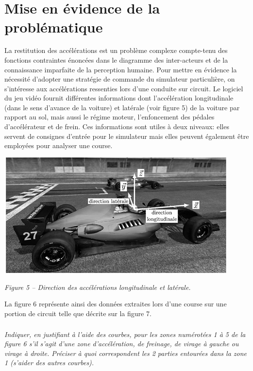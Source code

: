 \documentclass[10pt,fleqn]{article} %
\begin{document}
\section{Mise en évidence de la problématique \label{sec_1}}
La restitution des accélérations est un problème complexe compte-tenu des fonctions contraintes énoncées dans le diagramme des inter-acteurs et de la connaissance imparfaite de la perception humaine. 
Pour mettre en évidence la nécessité d'adopter une stratégie de commande du simulateur particulière, on s'intéresse aux accélérations ressenties lors d'une conduite sur circuit. Le logiciel du jeu vidéo fournit différentes informations dont l'accélération longitudinale (dans le sens d'avance de la voiture) et latérale (voir figure 5) de la voiture par rapport au sol, mais aussi le régime moteur, l'enfoncement des pédales d'accélérateur et de frein. Ces informations sont utiles à deux niveaux: elles servent de consignes d'entrée pour le simulateur mais elles peuvent également être employées pour analyser une course. 


\begin{center}
\includegraphics[width=.9\linewidth]{images/fig_05}

\textit{Figure 5 -- Direction des accélérations longitudinale et latérale.}
\end{center}

La figure 6%
représente ainsi des données extraites lors d'une course sur une portion de circuit telle que décrite sur la figure 7.%



\subparagraph{}
\textit{Indiquer, en justifiant à l'aide des courbes, pour les zones numérotées 1 à 5 de la figure 6 s'il s'agit d'une zone d'accélération, de freinage, de virage à gauche ou virage à droite. Préciser à quoi correspondent les 2 parties entourées dans la zone 1 (s'aider des autres courbes).}
\ifprof
\begin{corrige}
\end{corrige}
\else
\fi
\end{document}
